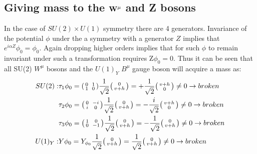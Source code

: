 \subsection{Giving mass to the $\bf{W^{\mu}}$ and Z bosons}
In the case of $SU(2)\times U(1)$ symmetry  there are 4 generators.
Invariance of the potential $\phi$ under the a symmetry with a generator $Z$ implies that $e^{i\alpha Z}\phi_{0} = \phi_{0}$.  Again dropping higher orders implies that for such $\phi$ to remain invariant under such a transformation requires Z$\phi_{0} = 0$. Thus it can be seen that all SU(2) $W^{\mu}$  bosons and the $U(1)_{Y}$ $B^{\mu}$ gauge boson will acquire a mass as:
\begin{equation}
  \begin{split}
    SU(2):
    &\tau_{1}\phi_{0} =\begin{psmallmatrix}0&&1\\1&&0\end{psmallmatrix}\frac{1}{\sqrt{2}} \begin{psmallmatrix}0\\v+h\end{psmallmatrix}= +\frac{1}{\sqrt{2}}\begin{psmallmatrix}v+h\\0\end{psmallmatrix}\neq 0 \to broken\\
    &\tau_{2}\phi_{0} =\begin{psmallmatrix}0&&-i\\i&&0\end{psmallmatrix}\frac{1}{\sqrt{2}}\begin{psmallmatrix}0\\v+h\end{psmallmatrix}= -\frac{i}{\sqrt{2}}\begin{psmallmatrix}v+h\\0\end{psmallmatrix}\neq 0 \to broken\\
    &\tau_{3}\phi_{0} =\begin{psmallmatrix}1&&0\\0&&-1\end{psmallmatrix}\frac{1}{\sqrt{2}}\begin{psmallmatrix}0\\v+h\end{psmallmatrix}= -\frac{1}{\sqrt{2}}\begin{psmallmatrix}0\\v+h\end{psmallmatrix}\neq 0 \to broken\\
    U(1)_{Y}:
    &Y\phi_{0} =         Y_{\phi_{0}}\frac{1}{\sqrt{2}} \begin{psmallmatrix}0\\v+h\end{psmallmatrix}= \frac{1}{\sqrt{2}}\begin{psmallmatrix}0\\v+h\end{psmallmatrix}\neq 0 \to broken\\
  \end{split}
\end{equation}
